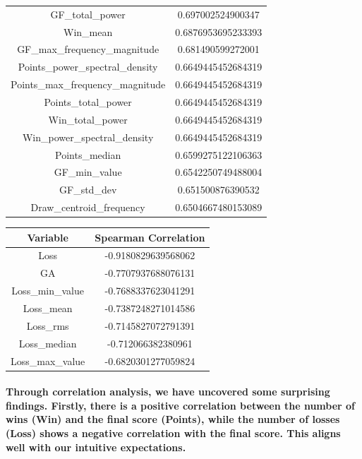 \begin{center}
\begin{tabular}{cc}
        GF\_total\_power                  & 0.697002524900347    \\
        Win\_mean                         & 0.6876953695233393   \\
        GF\_max\_frequency\_magnitude     & 0.681490599272001    \\
        Points\_power\_spectral\_density  & 0.6649445452684319   \\
        Points\_max\_frequency\_magnitude & 0.6649445452684319   \\
        Points\_total\_power              & 0.6649445452684319   \\
        Win\_total\_power                 & 0.6649445452684319   \\
        Win\_power\_spectral\_density     & 0.6649445452684319   \\
        Points\_median                    & 0.6599275122106363   \\
        GF\_min\_value                    & 0.6542250749488004   \\
        GF\_std\_dev                      & 0.651500876390532    \\
        Draw\_centroid\_frequency         & 0.6504667480153089   \\
        \hline
    \end{tabular}
\end{center}
% 
% 
% 
% 
% 
% 
% 
% 
\begin{center}
    \begin{tabular}{cc}
        \hline
        Variable & Spearman Correlation \\
        \hline
        Loss & -0.9180829639568062 \\
        GA & -0.7707937688076131 \\
        Loss\_min\_value & -0.7688337623041291 \\
        Loss\_mean & -0.7387248271014586 \\
        Loss\_rms & -0.7145827072791391 \\
        Loss\_median & -0.712066382380961 \\
        Loss\_max\_value & -0.6820301277059824 \\
        \hline
        \end{tabular}
\end{center}
% 
\paragraph{Through correlation analysis, we have uncovered some surprising findings. Firstly, there is a positive correlation between the number of wins (Win) and the final score (Points), while the number of losses (Loss) shows a negative correlation with the final score. This aligns well with our intuitive expectations.}
% 
